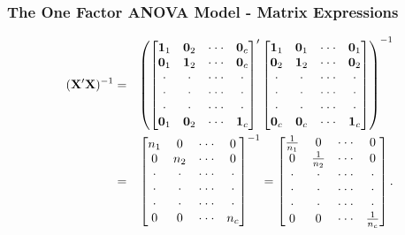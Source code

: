     \begin{frame}%
 \frametitle{The One Factor ANOVA Model - Matrix Expressions}
\begin{eqnarray*}
(\mathbf{X^{\prime }X})^{-1} &=&\left(
\begin{bmatrix}
\mathbf{1}_1 & \mathbf{0}_2 & \cdot \cdot \cdot  & \mathbf{0}_c \\
\mathbf{0}_1 & \mathbf{1}_2 & \cdot \cdot \cdot  & \mathbf{0}_c \\
\cdot  & \cdot  & \cdot \cdot \cdot  & \cdot  \\
\cdot  & \cdot  & \cdot \cdot \cdot  & \cdot  \\
\cdot  & \cdot  & \cdot \cdot \cdot  & \cdot  \\
\mathbf{0}_{1} & \mathbf{0}_{2} & \cdot \cdot \cdot  & \mathbf{1}_c%
\end{bmatrix}^{\prime }%
\begin{bmatrix}
\mathbf{1}_1 & \mathbf{0}_1 & \cdot \cdot \cdot  & \mathbf{0}%
_{1} \\
\mathbf{0}_{2} & \mathbf{1}_2 & \cdot \cdot \cdot  & \mathbf{0}%
_{2} \\
\cdot  & \cdot  & \cdot \cdot \cdot  & \cdot  \\
\cdot  & \cdot  & \cdot \cdot \cdot  & \cdot  \\
\cdot  & \cdot  & \cdot \cdot \cdot  & \cdot  \\
\mathbf{0}_{c} & \mathbf{0}_{c} & \cdot \cdot \cdot  & \mathbf{1}_c
\end{bmatrix} \notag
\right) ^{-1} \\
&=&%
\begin{bmatrix}
n_1 & 0 & \cdot \cdot \cdot  & 0 \\
0 & n_2 & \cdot \cdot \cdot  & 0 \\
\cdot  & \cdot  & \cdot \cdot \cdot  & \cdot  \\
\cdot  & \cdot  & \cdot \cdot \cdot  & \cdot  \\
\cdot  & \cdot  & \cdot \cdot \cdot  & \cdot  \\
0 & 0 & \cdot \cdot \cdot  & n_c%
\end{bmatrix}%
^{-1}=%
\begin{bmatrix}
\frac{1}{n_1} & 0 & \cdot \cdot \cdot  & 0 \\
0 & \frac{1}{n_2} & \cdot \cdot \cdot  & 0 \\
\cdot  & \cdot  & \cdot \cdot \cdot  & \cdot  \\
\cdot  & \cdot  & \cdot \cdot \cdot  & \cdot  \\
\cdot  & \cdot  & \cdot \cdot \cdot  & \cdot  \\
0 & 0 & \cdot \cdot \cdot  & \frac{1}{n_c}
\end{bmatrix}%
.
\end{eqnarray*}
    \end{frame}
